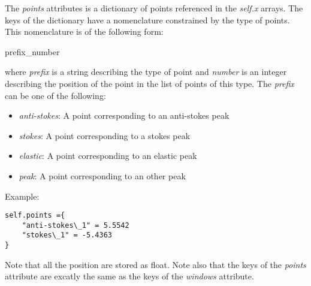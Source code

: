 The \textit{points} attributes is a dictionary of points referenced in the \textit{self.x} arrays. The keys of the dictionary have a nomenclature constrained by the type of points. This nomenclature is of the following form:
\begin{center}
    prefix\_number
\end{center}
where \textit{prefix} is a string describing the type of point and \textit{number} is an integer describing the position of the point in the list of points of this type. The \textit{prefix} can be one of the following:
\begin{itemize}
    \item \textit{anti-stokes}: A point corresponding to an anti-stokes peak
    \item \textit{stokes}: A point corresponding to a stokes peak
    \item \textit{elastic}: A point corresponding to an elastic peak
    \item \textit{peak}: A point corresponding to an other peak
\end{itemize}

Example:
\begin{lstlisting}
self.points ={
    "anti-stokes\_1" = 5.5542
    "stokes\_1" = -5.4363
}
\end{lstlisting}

Note that all the position are stored as float. Note also that the keys of the \textit{points} attribute are excatly the same as the keys of the \textit{windows} attribute.
